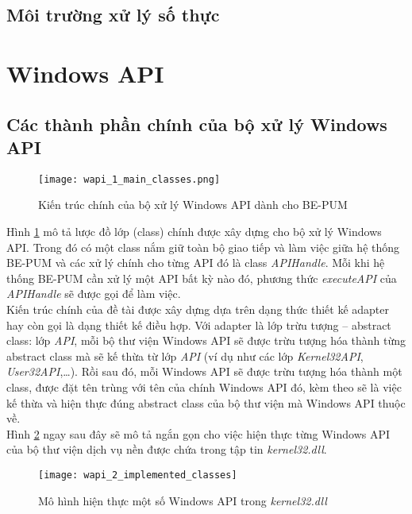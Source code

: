 	\subsection*{Môi trường xử lý số thực}
	

		
\newpage
\section{Windows API}

	\subsection{Các thành phần chính của bộ xử lý Windows API} \label{sec:main_classes}

	\begin{figure}[htp]
	\centering
		\texttt{[image: wapi\_1\_main\_classes.png]}
		\caption{Kiến trúc chính của bộ xử lý Windows API dành cho BE-PUM}	
		\label{fig:wapi_1_main_classes}		
	\end{figure}

Hình \ref{fig:wapi_1_main_classes} mô tả lược đồ lớp (class) chính được xây dựng cho bộ xử lý Windows API. Trong đó có một class nắm giữ toàn bộ giao tiếp và làm việc giữa hệ thống BE-PUM và các xử lý chính cho từng API đó là class \textit{APIHandle}. Mỗi khi hệ thống BE-PUM cần xử lý một API bất kỳ nào đó, phương thức \textit{executeAPI} của \textit{APIHandle} sẽ được gọi để làm việc.\\

Kiến trúc chính của đề tài được xây dựng dựa trên dạng thức thiết kế adapter hay còn gọi là dạng thiết kế điều hợp. Với adapter là lớp trừu tượng – abstract class: lớp \textit{API}, mỗi bộ thư viện Windows API sẽ được trừu tượng hóa thành từng abstract class mà sẽ kế thừa từ lớp \textit{API} (ví dụ như các lớp \textit{Kernel32API}, \textit{User32API},…). Rồi sau đó, mỗi Windows API sẽ được trừu tượng hóa thành một class, được đặt tên trùng với tên của chính Windows API đó, kèm theo sẽ là việc kế thừa và hiện thực đúng abstract class của bộ thư viện mà Windows API thuộc về.\\

Hình \ref{fig:wapi_2_implemented_classes} ngay sau đây sẽ mô tả ngắn gọn cho việc hiện thực từng Windows API của bộ thư viện dịch vụ nền được chứa trong tập tin \textit{kernel32.dll}.

	\begin{figure}[htp]
	\centering
		\texttt{[image: wapi\_2\_implemented\_classes]}
		\caption{Mô hình hiện thực một số Windows API trong \textit{kernel32.dll}}	
		\label{fig:wapi_2_implemented_classes}		
	\end{figure}

